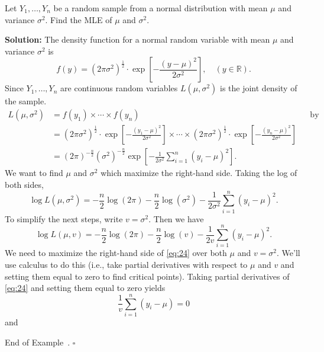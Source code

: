 \documentclass[10pt]{article}
\theoremstyle{definition}
\newtheorem{example}[theorem]{Example}
\renewenvironment{example}
{\begin{oldexample}}
  {\par\smallskip\hfill   End of Example~\theexample. $\square$    \par\end{oldexample}}
\newcommand{\vt}{\vskip 5mm} %
\newcommand{\Fl}{\vt\noindent\textbf} %
\newcommand{\1}[1]{\textbf{1}_{\left[#1\right]}} %
\def\R{\mathbb{R}} %
\begin{document}
\begin{example}
  Let $Y_{1},\ldots,Y_{n}$ be a random sample from a normal distribution with
  mean $\mu$ and variance $\sigma^{2}$. Find the MLE of $\mu$ and
  $\sigma^{2}$. 

  \Fl{Solution:} The density function for a normal random variable with mean
  $\mu$ and variance $\sigma^{2}$ is
  \begin{equation*}
    f(y) = (2\pi\sigma^{2})^{\frac{1}{2}}\cdot \exp\left[-\frac{(y-\mu)^{2}}{2\sigma^{2}} \right], \quad (y\in \R).
  \end{equation*}  
  Since $Y_{1},\ldots,Y_{n}$ are continuous random variables
  $L(\mu,\sigma^{2})$ is the joint density of the sample. 
  \begin{align*}
    L(\mu,\sigma^{2})
    &= f(y_{1})\times \cdots\times f(y_{n}) &&\text{by independence}\\
    &= (2\pi\sigma^{2})^{\frac{1}{2}}\cdot\exp\left[-\frac{(y_{1}-\mu)^{2}}{2\sigma^{2}} \right] \times \cdots \times(2\pi\sigma^{2})^{\frac{1}{2}} \cdot\exp\left[-\frac{(y_{n}-\mu)^{2}}{2\sigma^{2}} \right]\\
    &= \left( 2\pi \right)^{-\frac{n}{2}} \left( \sigma^{2} \right)^{-\frac{n}{2}}   \exp\left[-\frac{1}{2\sigma^{2}}\sum_{i=1}^{n} (y_{i}-\mu)^{2} \right].
  \end{align*}
  We want to find $\mu$ and $\sigma^{2}$ which maximize the right-hand side.
  Taking the log of both sides,
  \begin{equation*}
    \log L(\mu,\sigma^{2}) = -\frac{n}{2}\log\left(2\pi \right)  - \frac{n}{2} \log(\sigma^{2}) - \frac{1}{2\sigma^{2}}\sum_{i=1}^{n} (y_{i}-\mu)^{2}.
  \end{equation*}
  To simplify the next steps, write $v=\sigma^{2}$. Then we have
  \begin{equation}\label{eq:24}
    \log L(\mu,v) = -\frac{n}{2}\log\left(2\pi \right)  - \frac{n}{2} \log(v) - \frac{1}{2v}\sum_{i=1}^{n} (y_{i}-\mu)^{2}.
  \end{equation}
  We need to maximize the right-hand side of \cref{eq:24} over both $\mu$ and
  $v=\sigma^{2}$. We'll use calculus to do this (i.e., take partial
  derivatives with respect to $\mu$ and $v$ and setting them equal to zero to
  find critical points). Taking partial derivatives of \cref{eq:24} and
  setting them equal to zero yields
  \begin{equation}\label{eq:25}
     \frac{1}{v}\sum_{i=1}^{n} (y_{i}-\mu)=0
  \end{equation}
  and
  \begin{equation}\label{eq:26}

\end{equation}
\end{example}
\end{document}
